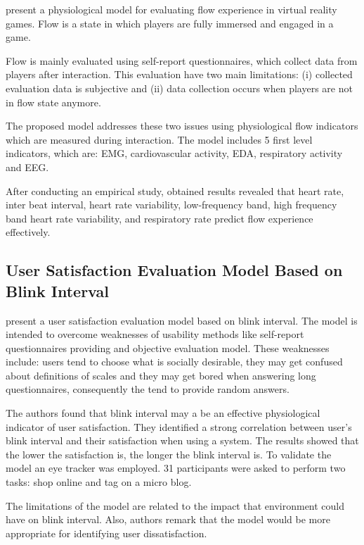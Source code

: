 \textcite{Bian2015} present a physiological model for evaluating flow experience in virtual reality games. Flow is a state in which players are fully immersed and engaged in a game.

Flow is mainly evaluated using self-report questionnaires, which collect data from players after interaction. This evaluation have two main limitations: (i) collected evaluation data is subjective and (ii) data collection occurs when players are not in flow state anymore.

The proposed model addresses these two issues using physiological flow indicators which are measured during interaction. The model includes 5 first level indicators, which are: \ac{EMG}, cardiovascular activity, \ac{EDA}, respiratory activity and \ac{EEG}.

After conducting an empirical study, obtained results revealed that heart rate, inter beat interval, heart rate variability, low-frequency band, high frequency band heart rate variability, and respiratory rate predict flow experience effectively.

\subsection{User Satisfaction Evaluation Model Based on Blink Interval}

\textcite{hou2015} present a user satisfaction evaluation model based on blink interval. The model is intended to overcome weaknesses of usability methods like self-report questionnaires providing and objective evaluation model. These weaknesses include: users tend to choose what is socially desirable, they may get confused about definitions of scales and they may get bored when answering long questionnaires, consequently the tend to provide random answers.

The authors found that blink interval may a be an effective physiological indicator of user satisfaction. They identified a strong correlation between user's blink interval and their satisfaction when using a system. The results showed that the lower the satisfaction is, the longer the blink interval is. To validate the model an eye tracker was employed. 31 participants were asked to perform two tasks: shop online and tag on a micro blog.

The limitations of the model are related to the impact that environment could have on blink interval. Also, authors remark that the model would be more appropriate for identifying user dissatisfaction.

